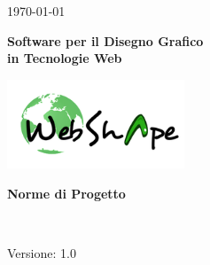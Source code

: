 
\title{\TITOLODOC}
\author{Geremia Mirco}



\renewcommand{\insertversion}{1.0} %
\renewcommand{\TITOLODOC}{Norme di Progetto} %
\renewcommand{\glosspath}{.\glossario} %

\begin{titlepage}
\begin{center}
	\begin{Large}	\today \end{Large}
\end{center}

\vspace{20pt}

\begin{center}
	\begin{Huge}
				\textbf{\ajax}
	\end{Huge}
\end{center}			

\begin{center}
	\begin{large}
				\textbf{Software per il Disegno Grafico\\ in Tecnologie Web}
	\end{large}
\end{center}			

\vspace{20pt}

\begin{center}
\includegraphics[width=150pt]{../logo/logo}
\end{center}

\vspace{170pt}
\begin{center} %
	\begin{Huge}
				\textbf{\TITOLODOC}
	\end{Huge}
			\\
\end{center}
\vspace{210pt}
\begin{center}
Versione: \insertversion
\end{center}
\end{titlepage}

